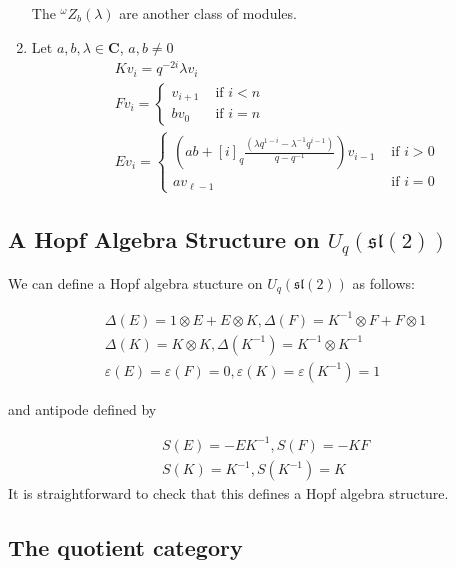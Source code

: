 \documentclass[]{article}
\begin{document}
\begin{enumerate}
    The $^\omega Z_b(\lambda)$ are another class of modules.
\item Let $a,b,\lambda \in \mathbf{C}$, $a,b\neq 0$
\begin{align*}
    &K v_i = q^{-2i} \lambda v_i \\
    &F v_i = \begin{cases} 
                v_{i+1}& \text{ if $i < n$} \\  
                b v_0& \text{ if $i = n$} 
             \end{cases}  \\
    &E v_i = \begin{cases} 
                \left(ab + [i]_q \frac{(\lambda q^{1-i} - \lambda^{-1} q^{i-1})}{q - q^{-1}}\right) v_{i-1}& \text{ if $i > 0$} \\ 
                a v_{\ell - 1}& \text{ if $i = 0$} 
             \end{cases} 
\end{align*}
\end{enumerate}
\subsection{A Hopf Algebra Structure on $U_q(\mathfrak{sl}(2))$}

We can define a Hopf algebra stucture on $U_q(\mathfrak{sl}(2))$ as follows:

\begin{align}
    &\Delta(E) = 1 \otimes E + E \otimes K, \Delta(F) = K^{-1} \otimes F + F \otimes 1 \\
    &\Delta(K) = K \otimes K, \Delta(K^{-1}) = K^{-1} \otimes K^{-1}\\ 
    &\varepsilon(E) = \varepsilon(F) = 0, \varepsilon(K) = \varepsilon(K^{-1}) = 1
\end{align}

and antipode defined by 

\begin{align}
    & S(E) = -EK^{-1}, S(F) = -KF \\
    & S(K) = K^{-1}, S(K^{-1}) = K 
\end{align}
It is straightforward to check that this defines a Hopf algebra structure. 

\subsection{The quotient category}
\end{document}
